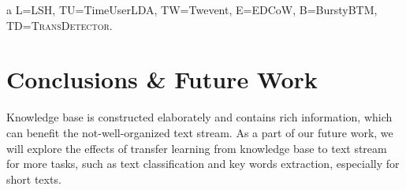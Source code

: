 \documentclass[runningheads,a4paper]{llncs}
\theoremstyle{exampstyle}
\begin{document}
\begin{table}
{\begin{threeparttable}
\begin{tablenotes}  
\item[a] L=LSH\cite{Petrovic:2010uj}, TU=TimeUserLDA\cite{Diao:2012wj}, TW=Twevent\cite{Twevent2012}, E=EDCoW\cite{Weng:2011wz}, B=BurstyBTM\cite{Yan:2015wm}, TD=\textsc{TransDetector}.
\end{tablenotes}  
\end{threeparttable}  
}
\end{table}

\section{Conclusions \& Future Work}
Knowledge base is constructed elaborately and contains rich information, which can benefit the not-well-organized text stream. 
As a part of our future work, we will explore the effects of transfer learning from knowledge base to text stream for more tasks, such as text classification and key words extraction, especially for short texts. 



\small

\end{document}
